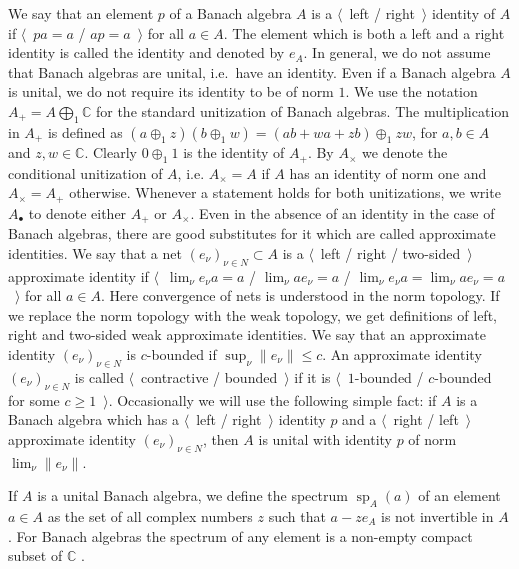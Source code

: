 We say that an element $p$ of a Banach algebra $A$ is a $\langle$~left /
right~$\rangle$ identity of $A$ if $\langle$~$pa=a$ / $ap=a$~$\rangle$ for all
$a\in A$. The element which is both a left and a right identity is called the
identity and denoted by $e_A$. In general, we do not assume that Banach algebras
are unital, i.e.\ have an identity. Even if a Banach algebra $A$ is unital, we do
not require its identity to be of norm $1$. We use the notation
$A_+=A\bigoplus_1\mathbb{C}$ for the standard unitization of Banach algebras.
The multiplication in $A_+$ is defined as $(a\oplus_1 z)(b\oplus_1
w)=(ab+wa+zb)\oplus_1 zw$, for $a,b\in A$ and $z,w\in\mathbb{C}$. Clearly
$0\oplus_1 1$ is the identity of $A_+$. By $A_\times$ we denote the conditional
unitization of $A$, i.e. $A_\times=A$ if $A$ has an identity of norm one and
$A_\times=A_+$ otherwise. Whenever a statement holds for both unitizations, we
write $A_\bullet$ to denote either $A_+$ or $A_\times$. Even in the absence of
an identity in the case of Banach
algebras, there are good substitutes for it which are called approximate
identities. We say that a net ${(e_\nu)}_{\nu\in N}\subset A$ is a 
$\langle$~left / right / two-sided~$\rangle$ approximate identity if 
$\langle$~$\lim_\nu e_\nu a=a$ / $\lim_\nu ae_\nu=a$ / 
$\lim_\nu e_\nu a=\lim_\nu ae_\nu=a$~$\rangle$ for
all $a\in A$. Here convergence of nets is understood
in the norm topology. If we replace the norm topology with the weak topology, we get
definitions of left, right and two-sided weak approximate identities. We say
that an approximate identity ${(e_\nu)}_{\nu\in N}$ is $c$-bounded if
$\sup_\nu\lVert e_\nu\rVert\leq c$. An approximate identity ${(e_\nu)}_{\nu\in N}$
is called $\langle$~contractive / bounded~$\rangle$ if it is
$\langle$~$1$-bounded / $c$-bounded for some $c\geq 1$~$\rangle$. Occasionally
we will use the following simple fact: if $A$ is a Banach algebra which has a
$\langle$~left / right~$\rangle$ identity $p$ and a $\langle$~right /
left~$\rangle$ approximate identity ${(e_\nu)}_{\nu\in N}$, then $A$ is unital
with identity $p$ of norm $\lim_\nu\lVert e_\nu\rVert$. 

If $A$ is a unital Banach algebra, we define the spectrum
$\operatorname{sp}_A(a)$ of an element $a\in A$ as the set of all complex numbers
$z$ such that $a-ze_A$ is not invertible in $A$. For Banach algebras the
spectrum of any element is a non-empty compact subset of $\mathbb{C}$
\cite[corollary 2.1.16]{HelBanLocConvAlg}.

